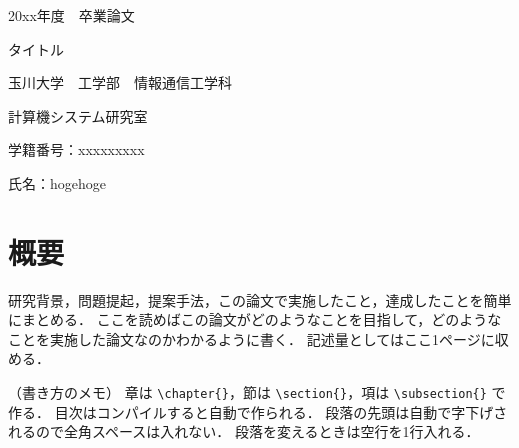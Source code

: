 \documentclass[uplatex,dvipdfmx,a4paper,11pt,openany,nomag*]{jsreport}
\begin{document}
\begin{titlepage}
  \centering
  {\LARGE 20xx年度　卒業論文\par}
  \vspace{20mm}
  {\Huge タイトル\par}
  \vfill
  {\Large
    玉川大学　工学部　情報通信工学科\par
    計算機システム研究室\par
    学籍番号：xxxxxxxxx\par
    氏名：hogehoge\par}
  \vspace{60mm}
\end{titlepage}

\chapter*{概要}

研究背景，問題提起，提案手法，この論文で実施したこと，達成したことを簡単にまとめる．
ここを読めばこの論文がどのようなことを目指して，どのようなことを実施した論文なのかわかるように書く．
記述量としてはここ1ページに収める．

（書き方のメモ）
章は \verb|\chapter{}|，節は \verb|\section{}|，項は \verb|\subsection{}| で作る．
目次はコンパイルすると自動で作られる．
段落の先頭は自動で字下げされるので全角スペースは入れない．
段落を変えるときは空行を1行入れる．

\tableofcontents
\end{document}
